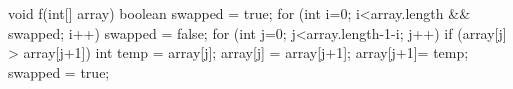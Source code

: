 void f(int[] array){
    boolean swapped = true;
    for (int i=0; i<array.length && swapped; i++){
        swapped = false;
        for (int j=0; j<array.length-1-i; j++){
            if (array[j] > array[j+1]){
                int temp = array[j];
                array[j] = array[j+1];
                array[j+1]= temp;
                swapped = true;
            }
        }
}}